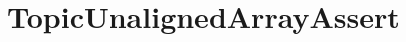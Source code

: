 \hypertarget{group___topic_unaligned_array_assert}{}\section{Topic\+Unaligned\+Array\+Assert}
\label{group___topic_unaligned_array_assert}
